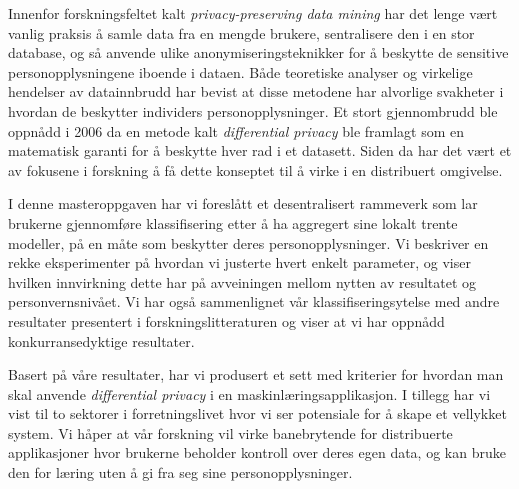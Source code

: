 \noindent 
Innenfor forskningsfeltet kalt \textit{privacy-preserving data mining} har det lenge v{\ae}rt vanlig praksis {\aa} samle data fra en mengde brukere, sentralisere den i en stor database, og s{\aa} anvende ulike anonymiseringsteknikker for {\aa} beskytte de sensitive personopplysningene iboende i dataen. B{\aa}de teoretiske analyser og virkelige hendelser av datainnbrudd har bevist at disse metodene har alvorlige svakheter i hvordan de beskytter individers personopplysninger. Et stort gjennombrudd ble oppn{\aa}dd i 2006 da en metode kalt \textit{differential privacy} ble framlagt som en matematisk garanti for {\aa} beskytte hver rad i et datasett. Siden da har det v{\ae}rt et av fokusene i forskning {\aa} f{\aa} dette konseptet til {\aa} virke i en distribuert omgivelse.

I denne masteroppgaven har vi foresl{\aa}tt et desentralisert rammeverk som lar brukerne gjennomf{\o}re klassifisering etter {\aa} ha aggregert sine lokalt trente modeller, p{\aa} en m{\aa}te som beskytter deres personopplysninger. Vi beskriver en rekke eksperimenter p{\aa} hvordan vi justerte hvert enkelt parameter, og viser hvilken innvirkning dette har p{\aa} avveiningen mellom nytten av resultatet og personvernsniv{\aa}et. Vi har ogs{\aa} sammenlignet v{\aa}r klassifiseringsytelse med andre resultater presentert i forskningslitteraturen og viser at vi har oppn{\aa}dd konkurransedyktige resultater.     

Basert p{\aa} v{\aa}re resultater, har vi produsert et sett med kriterier for hvordan man skal anvende \textit{differential privacy} i en maskinl{\ae}ringsapplikasjon. I tillegg har vi vist til to sektorer i forretningslivet hvor vi ser potensiale for {\aa} skape et 
vellykket system. Vi h{\aa}per at v{\aa}r forskning vil virke banebrytende for distribuerte applikasjoner hvor brukerne beholder kontroll over deres egen data, og kan bruke den for l{\ae}ring uten {\aa} gi fra seg sine personopplysninger.   

\cleardoublepage